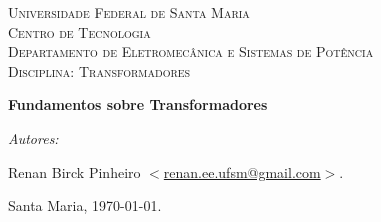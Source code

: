 \begin{titlepage}
\begin{center}

\textsc{\LARGE Universidade Federal de Santa Maria}\\[1.5cm]
\textsc{\Large Centro de Tecnologia}\\[0.5cm]
\textsc{\Large Departamento de Eletromecânica e Sistemas de Potência}\\[0.5cm]
\textsc{\Large Disciplina: Transformadores}\\[0.5cm]
\setlength{\oddsidemargin}{0pt} %
\setlength{\evensidemargin}{0pt} %
\setlength{\textwidth}{15cm}
\end{center}

\vspace*{5cm}
\begin{center}
{\huge \bfseries Fundamentos sobre Transformadores}\\[0.4cm]
\end{center}

\vspace*{130px}
\begin{flushright}
\emph{Autores:}

Renan Birck Pinheiro $<$\url{renan.ee.ufsm@gmail.com}$>$. \newline



\end{flushright}
\begin{center}
Santa Maria, \today.

\end{center}


\end{titlepage}